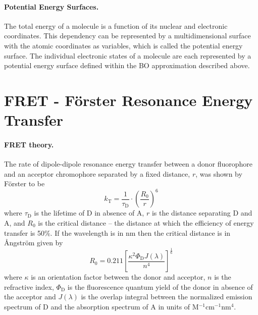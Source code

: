  \paragraph{Potential Energy Surfaces.} The total energy of a molecule is a function of its nuclear and electronic coordinates. This dependency can be represented by a multidimensional surface with the atomic coordinates as variables, which is called the potential energy surface. The individual electronic states of a molecule are each represented by a potential energy surface defined within the BO approximation described above.

\section{FRET - Förster Resonance Energy Transfer}
\label{sec:FRET}
 \paragraph{FRET theory.} The rate of dipole-dipole resonance energy transfer between a donor fluorophore and an acceptor chromophore separated by a fixed distance, $r$, was shown by Förster to be\cite{Clegg1996}
\begin{equation}
 k_\textrm{T} = \frac{1}{\tau_\mathrm{D}} \cdot
                \left(\frac{R_0}{r}\right)^6
 \label{eqn:kT}
\end{equation}
 where $\tau_\mathrm{D}$ is the lifetime of D in absence of A, $r$ is the distance separating D and A, and $R_0$ is the critical distance \--- the distance at which the efficiency of energy transfer is 50\%. If the wavelength is in nm then the critical distance is in Ångström given by
\begin{equation}
 R_0 = 0.211 \left[\frac{\kappa^2\Phi_\mathrm{D}J(\lambda)}{n^4}\right]^{\frac{1}{6}}
 \label{eqn:R0_2}
\end{equation}
 where $\kappa$ is an orientation factor between the donor and acceptor, $n$ is the refractive index, $\Phi_\mathrm{D}$ is the fluorescence quantum yield of the donor in absence of the acceptor and $J(\lambda)$ is the overlap integral between the normalized emission spectrum of D and the absorption spectrum of A in units of \footnotesize{M}\normalsize$^{-1}$cm$^{-1}$nm$^4$.

